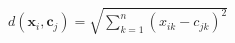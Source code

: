 \documentclass[preview]{standalone}
\begin{document}
\begin{align*}
d(\mathbf{x}_i, \mathbf{c}_j) = \sqrt{\sum_{k=1}^{n} (x_{ik} - c_{jk})^2}
\end{align*}
\end{document}
